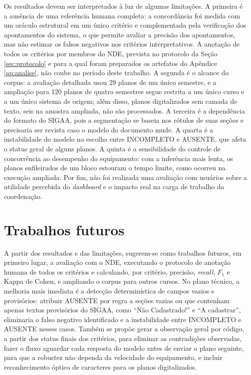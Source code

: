 Os resultados devem ser interpretados à luz de algumas limitações. A primeira é a ausência de uma referência humana completa: a concordância foi medida com um oráculo estrutural em um único critério e complementada pela verificação dos apontamentos do sistema, o que permite avaliar a precisão dos apontamentos, mas não estimar os falsos negativos nos critérios interpretativos. A anotação de todos os critérios por membros do NDE, prevista no protocolo da Seção \ref{sec:protocolo} e para a qual foram preparados os artefatos do Apêndice \ref{ap:analise}, não coube no período deste trabalho. A segunda é o alcance do corpus: a avaliação detalhada usou 29 planos de um único semestre, e a ampliação para 120 planos de quatro semestres segue restrita a um único curso e a um único sistema de origem; além disso, planos digitalizados sem camada de texto, seis na amostra ampliada, não são processados. A terceira é a dependência do formato do SIGAA, pois a segmentação se baseia nos rótulos de suas seções e precisaria ser revista caso o modelo do documento mude. A quarta é a instabilidade do modelo na escolha entre INCOMPLETO e AUSENTE, que afeta o status geral de alguns planos. A quinta é a sensibilidade do controle de concorrência ao desempenho do equipamento: com a inferência mais lenta, os planos enfileirados de um bloco estouram o tempo limite, como ocorreu na execução ampliada. Por fim, não foi realizada uma avaliação com usuários sobre a utilidade percebida do \textit{dashboard} e o impacto real na carga de trabalho da coordenação.

\section{Trabalhos futuros}
\label{sec:futuros}

A partir dos resultados e das limitações, sugerem-se como trabalhos futuros, em primeiro lugar, a avaliação com o NDE, executando o protocolo de anotação humana de todos os critérios e calculando, por critério, precisão, \textit{recall}, $F_1$ e Kappa de Cohen, e ampliando o corpus para outros cursos. No plano técnico, a melhoria mais imediata é a detecção determinística de campos vazios e provisórios: atribuir AUSENTE por regra a seções vazias ou que contenham apenas textos provisórios do SIGAA, como ``Não Cadastrado!'' e ``A cadastrar'', eliminaria o falso negativo identificado e a instabilidade entre INCOMPLETO e AUSENTE nesses casos. Também se propõe gerar a observação geral por código, a partir dos status finais dos critérios, para eliminar as contradições observadas, fazer o fluxo aguardar cada resposta do modelo antes de enviar o plano seguinte, para que a robustez não dependa da velocidade do equipamento, e incluir reconhecimento óptico de caracteres para os planos digitalizados.

